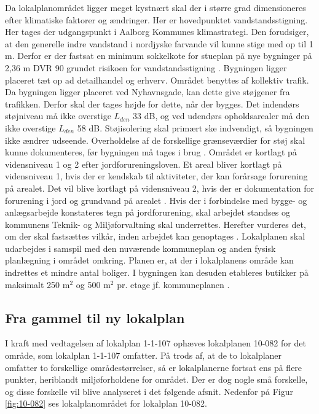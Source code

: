 Da lokalplanområdet ligger meget kystnært skal der i større grad dimensioneres efter klimatiske faktorer og ændringer. Her er hovedpunktet vandstandsstigning. Her tages der udgangspunkt i Aalborg Kommunes klimastrategi. Den forudsiger, at den generelle indre vandstand i nordjyske farvande vil kunne stige med op til 1 m. Derfor er der fastsat en minimum sokkelkote for stueplan på nye bygninger på 2,36 m DVR 90 grundet risikoen for vandstandsstigning \citep[ s. 9]{lokalplan}.
\newline \indent{     }  Bygningen ligger placeret tæt op ad detailhandel og erhverv. Området benyttes af kollektiv trafik. Da bygningen ligger placeret ved Nyhavnsgade, kan dette give støjgener fra trafikken. Derfor skal der tages højde for dette, når der bygges. Det indendørs støjniveau må ikke overstige $L_{den}$ 33 dB, og ved udendørs opholdsarealer må den ikke overstige $L_{den}$ 58 dB. Støjisolering skal primært ske indvendigt, så bygningen ikke ændrer udseende. Overholdelse af de forskellige grænseværdier for støj skal kunne dokumenteres, før bygningen må tages i brug \citep[ s. 8]{lokalplan}. Området er kortlagt på vidensniveau 1 og 2 efter jordforureningsloven. Et areal bliver kortlagt på vidensniveau 1, hvis der er kendskab til aktiviteter, der kan forårsage forurening på arealet. Det vil blive kortlagt på vidensniveau 2, hvis der er dokumentation for forurening i jord og grundvand på arealet \citep{vidensniveau}. Hvis der i forbindelse med bygge- og anlægsarbejde konstateres tegn på jordforurening, skal arbejdet standses og kommunens Teknik- og Miljøforvaltning skal underrettes. Herefter vurderes det, om der skal fastsættes vilkår, inden arbejdet kan genoptages \citep[ s. 10]{lokalplan}.
\newline
\newline
Lokalplanen skal udarbejdes i samspil med den nuværende kommuneplan og anden fysisk planlægning i området omkring. Planen er, at der i lokalplanens område kan indrettes et mindre antal boliger. I bygningen kan desuden etableres butikker på maksimalt 250 $\text{m}^2$  og 500 $\text{m}^2$ pr. etage jf. kommuneplanen \citep[ s. 8]{lokalplan}.

\subsection{Fra gammel til ny lokalplan}
I kraft med vedtagelsen af lokalplan 1-1-107 ophæves lokalplanen 10-082 for det område, som lokalplan 1-1-107 omfatter. På trods af, at de to lokalplaner omfatter to forskellige områdestørrelser, så er lokalplanerne fortsat ens på flere punkter, heriblandt miljøforholdene for området. Der er dog nogle små forskelle, og disse forskelle vil blive analyseret i det følgende afsnit. Nedenfor på Figur \ref{fig:10-082} ses lokalplanområdet for lokalplan 10-082.

